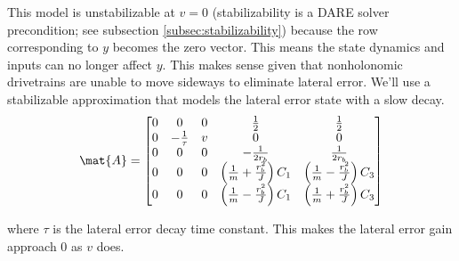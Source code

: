 This \gls{model} is unstabilizable at $v = 0$ (stabilizability is a DARE solver
precondition; see subsection \ref{subsec:stabilizability}) because the row
corresponding to $y$ becomes the zero vector. This means the state dynamics and
inputs can no longer affect $y$. This makes sense given that nonholonomic
drivetrains are unable to move sideways to eliminate lateral error. We'll use a
stabilizable approximation that models the lateral error state with a slow
decay.
\begin{equation*}
  \mat{A} =
  \begin{bmatrix}
    0 & 0 & 0 & \frac{1}{2} & \frac{1}{2} \\
    0 & -\frac{1}{\tau} & v & 0 & 0 \\
    0 & 0 & 0 & -\frac{1}{2r_b} & \frac{1}{2r_b} \\
    0 & 0 & 0 & \left(\frac{1}{m} + \frac{r_b^2}{J}\right) C_1 &
      \left(\frac{1}{m} - \frac{r_b^2}{J}\right) C_3 \\
    0 & 0 & 0 & \left(\frac{1}{m} - \frac{r_b^2}{J}\right) C_1 &
      \left(\frac{1}{m} + \frac{r_b^2}{J}\right) C_3
  \end{bmatrix}
\end{equation*}

where $\tau$ is the lateral error decay time constant. This makes the lateral
error gain approach $0$ as $v$ does.

